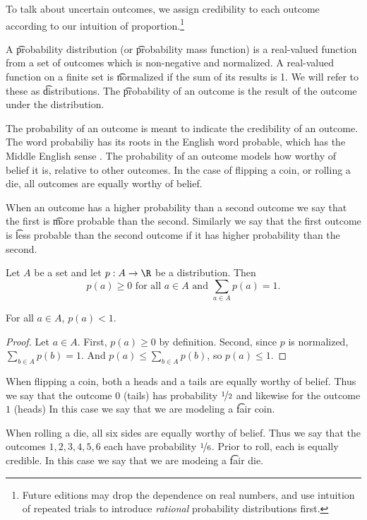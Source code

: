 

To talk about uncertain outcomes, we assign credibility to each outcome according to our intuition of proportion.\footnote{Future editions may drop the dependence on real numbers, and use intuition of repeated trials to introduce \textit{rational} probability distributions first.}


A \t{probability distribution} (or \t{probability mass function}) is a real-valued function from a set of outcomes which is non-negative and normalized.
A real-valued function on a finite set is \t{normalized} if the sum of its results is 1.
We will refer to these as \t{distributions}.
The \t{probability of an outcome} is the result of the outcome under the distribution.

The probability of an outcome is meant to indicate the credibility of an outcome.
The word probabiliy has its roots in the English word probable, which has the Middle English sense .
The probability of an outcome models how worthy of belief it is, relative to other outcomes.
In the case of flipping a coin, or rolling a die, all outcomes are equally worthy of belief.

When an outcome has a higher probability than a second outcome we say that the first is \t{more probable} than the second.
Similarly we say that the first outcome is \t{less probable} than the second outcome if it has higher probability than the second.


Let $A$ be a set and let $p: A \to \R$ be a distribution.
Then
\[
  p(a) \geq 0 \text{ for all } a \in A \text{ and } \sum_{a \in A} p(a) = 1.
\]

\begin{prop}
  For all $a \in A$, $p(a) < 1$.%
\begin{proof}

Let $a \in A$.
First, $p(a) \geq 0$ by definition.
Second, since $p$ is normalized, $\sum_{b \in A} p(b) = 1$.
And $p(a) \leq \sum_{b \in A} p(b)$, so $p(a) \leq 1$.

\end{proof}

\end{prop}

When flipping a coin, both a heads and a tails are equally worthy of belief.
Thus we say that the outcome $0$ (tails) has probability $\nicefrac{1}{2}$ and likewise for the outcome $1$ (heads)
In this case we say that we are modeling a \t{fair coin}.

When rolling a die, all six sides are equally worthy of belief.
Thus we say that the outcomes $1, 2, 3, 4, 5, 6$ each have probability $\nicefrac{1}{6}$.
Prior to roll, each is equally credible.
In this case we say that we are modeing a \t{fair die}.
